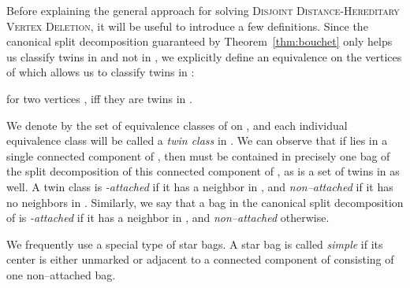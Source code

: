 \documentclass[11pt]{elsarticle}
\newcommand{\disjointDHVD}{\textsc{Disjoint Distance-Hereditary Vertex Deletion}}
\begin{document}
Before explaining the general approach for solving \disjointDHVD, it will be useful to introduce a few definitions.
Since the canonical split decomposition guaranteed by Theorem~\ref{thm:bouchet} only helps us classify twins in  and not in , we explicitly define an equivalence  on the vertices of  which allows us to classify twins in :
\begin{center}
for two vertices ,  iff they are twins in .
\end{center}

We denote by  the set of equivalence classes of  on , and each individual equivalence class will be called a \emph{twin class} in .
We can observe that if  lies in a single connected component of , then  must be contained in precisely one bag of the split decomposition of this connected component of , as  is a set of twins in  as well.
A twin class is \emph{-attached} if it has a neighbor in , and 
\emph{non--attached} if it has no neighbors in .
Similarly, we say that a bag in the canonical split decomposition of  is \emph{-attached} if it has a neighbor in , and
\emph{non--attached} otherwise.



We frequently use a special type of star bags.
A star bag  is called \emph{simple} if 
its center is either unmarked or adjacent to a connected component of  consisting of one non--attached bag.
\end{document}
